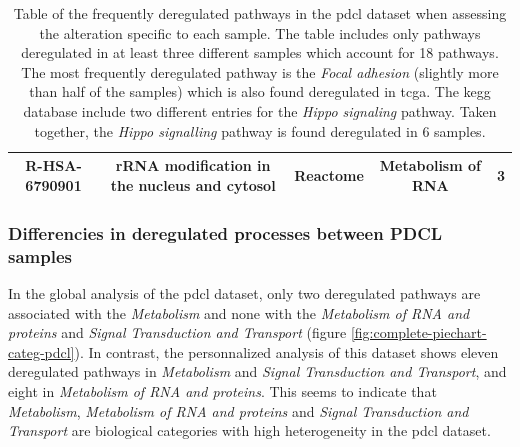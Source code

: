 \begin{table}
{\begin{tabular}{ |c|c|c|c|c| }
            R-HSA-6790901 & rRNA modification in the nucleus and cytosol & Reactome & Metabolism of RNA & 3 \\
            \hline
        \end{tabular}
    }
    \caption{
        Table of the frequently deregulated pathways in the \acrshort{pdcl} dataset when assessing the alteration specific to each sample.
        The table includes only pathways deregulated in at least three different samples which account for 18 pathways.
        The most frequently deregulated pathway is the \textit{Focal adhesion} (slightly more than half of the samples) which is also found deregulated in \acrshort{tcga}.
        The \acrshort{kegg} database include two different entries for the \textit{Hippo signaling} pathway.
        Taken together, the \textit{Hippo signalling} pathway is found deregulated in 6 samples.
    }
    \label{table:frequently-dereg-pathways}
\end{table}

\subsubsection{Differencies in deregulated processes between PDCL samples}

In the global analysis of the \acrshort{pdcl} dataset, only two deregulated pathways are associated with the \textit{Metabolism} and none with the \textit{Metabolism of RNA and proteins} and \textit{Signal Transduction and Transport} (figure \ref*{fig:complete-piechart-categ-pdcl}).
In contrast, the personnalized analysis of this dataset shows eleven deregulated pathways in \textit{Metabolism} and \textit{Signal Transduction and Transport}, and eight in \textit{Metabolism of RNA and proteins}.
This seems to indicate that \textit{Metabolism}, \textit{Metabolism of RNA and proteins} and \textit{Signal Transduction and Transport} are biological categories with high heterogeneity in the \acrshort{pdcl} dataset.


